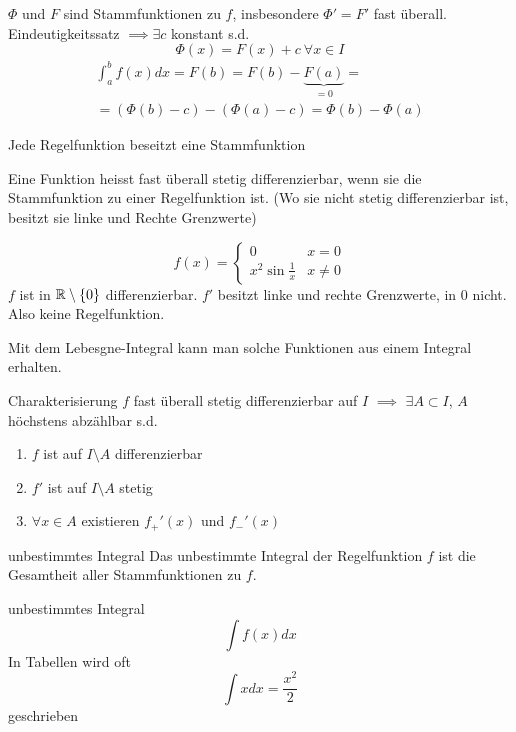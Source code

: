 \begin{Bew}
  $\Phi$ und $F$ sind Stammfunktionen zu $f$, insbesondere $\Phi'=F'$ fast überall. Eindeutigkeitssatz $\implies \exists c$ konstant s.d.
  \[\Phi(x)=F(x)+c\ \forall x\in I\]
  \begin{align*}
    \int^b_af(x)dx=F(b)=F(b)-\underbrace{F(a)}_{=0}=\\
    =\left( \Phi(b)-c \right) - \left( \Phi(a)-c \right) = \Phi(b)-\Phi(a)
  \end{align*}
\end{Bew}
\begin{Kor}
  Jede Regelfunktion beseitzt eine Stammfunktion  
\end{Kor}
\begin{Def}
  Eine Funktion heisst fast überall stetig differenzierbar, wenn sie die Stammfunktion zu einer Regelfunktion ist. (Wo sie nicht stetig differenzierbar ist, besitzt sie linke und Rechte Grenzwerte)
\end{Def}
\begin{Bsp}
  \[f(x)=\begin{cases}
    0& x=0\\
    x^2\sin\frac{1}{x}&x\neq 0
  \end{cases}\]
  $f$ ist in $\mathbb{R}\setminus\{0\}$ differenzierbar. $f'$ besitzt linke und rechte Grenzwerte, in 0 nicht. Also keine Regelfunktion.
\end{Bsp}
\begin{Bem}
  Mit dem Lebesgne-Integral kann man solche Funktionen aus einem Integral erhalten.
\end{Bem}
\begin{Eig}{Charakterisierung}
  $f$ fast überall stetig differenzierbar auf $I$ $\implies$ $\exists A\subset I$, $A$ höchstens abzählbar s.d.
  \begin{enumerate}
    \item $f$ ist auf $I\setminus A$ differenzierbar
    \item $f'$ ist auf $I\setminus A$ stetig
    \item $\forall x\in A$ existieren $f_+'(x)$ und $f_-'(x)$
  \end{enumerate}
\end{Eig}
\begin{Def}{unbestimmtes Integral}
  Das unbestimmte Integral der Regelfunktion $f$ ist die Gesamtheit aller Stammfunktionen zu $f$.
\end{Def}
\begin{Not}{unbestimmtes Integral}
  \[\int f(x)dx\]
  In Tabellen wird oft
  \[\int xdx = \frac{x^2}{2}\]
  geschrieben
\end{Not}
